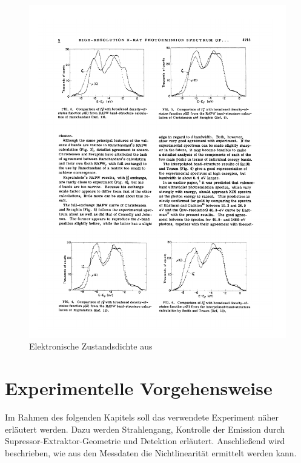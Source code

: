 \documentclass[bachelor,       %
               twoside,        %
               BCOR10mm,       %
               english,ngerman, %
               ]{GAUBM}
\begin{document}
\begin{figure}[h!]
	\centering
	\includegraphics{GoldZustandsdichte}
	\caption{Elektronische Zustandsdichte aus \cite{gold_zustandsdichte}}
	\label{fig:gold_zustandsdichte}
\end{figure}


\chapter{Experimentelle Vorgehensweise}
Im Rahmen des folgenden Kapitels soll das verwendete Experiment näher erläutert werden.
Dazu werden Strahlengang, Kontrolle der Emission durch Supressor-Extraktor-Geometrie und Detektion erläutert.
Anschließend wird beschrieben, wie aus den Messdaten die Nichtlinearität ermittelt werden kann.\\
\end{document}
